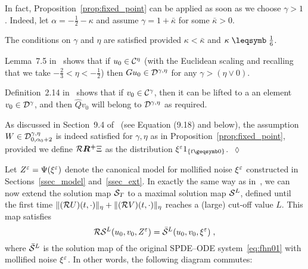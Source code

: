 \documentclass[reqno,11pt]{article}
\def\Rplus{\boldsymbol{R^+}}
\begin{document}
\begin{remark}
\label{rem:fix02}
In fact, Proposition~\ref{prop:fixed_point} can be applied as soon as we choose
$\gamma > 1$. Indeed, let $\alpha=-\frac12-\kappa$ and assume $\gamma = 1+\bar
\kappa$ for some $\bar\kappa>0$. 
\begin{enum}
\item 	The conditions on $\gamma$ and $\eta$ are satisfied provided $\kappa <
\bar \kappa$ and $\kappa \leqs \frac16$. 

\item 	Lemma~7.5 in~\cite{Hairer2014} shows that if $u_0\in{\mathcal C}^\eta$ (with the
Euclidean scaling and recalling that we take $-\frac23 < \eta < -\frac12$) then 
$Gu_0\in{\mathcal D}^{\gamma,\eta}$ for any $\gamma > (\eta\vee0)$.

\item 	Definition~2.14 in~\cite{Hairer2014} shows that if $v_0\in{\mathcal C}^\gamma$,
then it can be lifted to a an element $v_0\in{\mathcal D}^\gamma$, and then $\widehat Q
v_0$ will belong to ${\mathcal D}^{\gamma,\eta}$ as required. 

\item 	As discussed in Section~9.4 of~\cite{Hairer2014} (see Equation (9.18)
and below), the assumption $W\in{\mathcal D}^{\gamma,\eta}_{0,\alpha_0+2}$ is indeed
satisfied for $\gamma, \eta$ as in Proposition~\ref{prop:fixed_point}, provided
we define $\cR\Rplus\Xi$ as the distribution $\xi^\eps\indexfct{t\geqs0}$.~$\lozenge$  
\end{enum}
\end{remark}

Let $Z^\varepsilon = \Psi(\xi^\varepsilon)$ denote the canonical model for mollified noise
$\xi^\varepsilon$ constructed in Sections~\ref{ssec_model} and~\ref{ssec_ext}. In
exactly the same way as in~\cite[Prop.~9.8 and 9.10]{Hairer2014}, we can now
extend the solution map ${\mathcal S}_T$ to a maximal solution map ${\mathcal S}^L$, defined until
the first time $\lVert({\mathcal R} U)(t,\cdot)\rVert_\eta + \lVert({\mathcal R} V)(t,\cdot)\rVert_\eta$
reaches a (large) cut-off value $L$. This map satisfies 
\begin{equation}
\label{eq:fix07} 
 \cR \cS^L(u_0,v_0,Z^\eps) = \bar\cS^L(u_0,v_0,\xi^\eps)\;,
\end{equation}
where $\bar{{\mathcal S}}^L$ is the solution map of the original SPDE--ODE
system~\eqref{eq:fhn01} with mollified noise $\xi^\varepsilon$. In other words, the
following diagram commutes: 

\begin{center}
\end{center}
\end{document}
